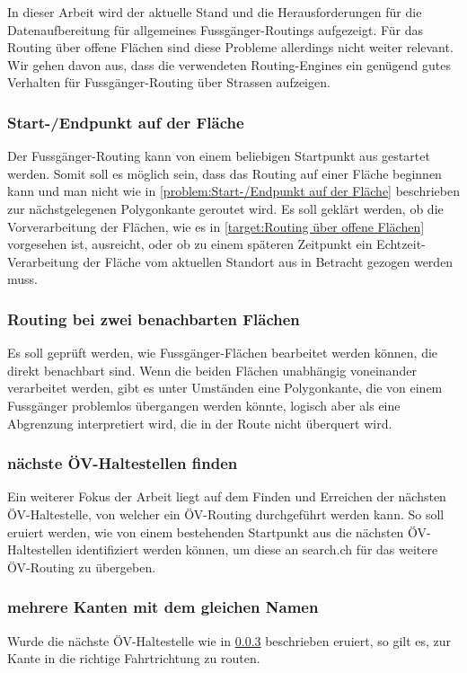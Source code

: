 In dieser Arbeit wird der aktuelle Stand und die Herausforderungen für die Datenaufbereitung für allgemeines Fussgänger-Routings aufgezeigt. Für das Routing über offene Flächen sind diese Probleme allerdings nicht weiter relevant. Wir gehen davon aus, dass die verwendeten Routing-Engines ein genügend gutes Verhalten für Fussgänger-Routing über Strassen aufzeigen.

\subsubsection{Start-/Endpunkt auf der Fläche}
\label{target:Start-/Endpunkt auf der Fläche}
Der Fussgänger-Routing kann von einem beliebigen Startpunkt aus gestartet werden. Somit soll es möglich sein, dass das Routing auf einer Fläche beginnen kann und man nicht wie in \ref{problem:Start-/Endpunkt auf der Fläche} beschrieben zur nächstgelegenen Polygonkante geroutet wird. Es soll geklärt werden, ob die Vorverarbeitung der Flächen, wie es in \ref{target:Routing über offene Flächen} vorgesehen ist, ausreicht, oder ob zu einem späteren Zeitpunkt ein Echtzeit-Verarbeitung der Fläche vom aktuellen Standort aus in Betracht gezogen werden muss.

\subsubsection{Routing bei zwei benachbarten Flächen}
\label{target:Routing bei zwei benachbarten Flächen}

Es soll geprüft werden, wie Fussgänger-Flächen bearbeitet werden können, die direkt benachbart sind. Wenn die beiden Flächen unabhängig voneinander verarbeitet werden, gibt es unter Umständen eine Polygonkante, die von einem Fussgänger problemlos übergangen werden könnte, logisch aber als eine Abgrenzung interpretiert wird, die in der Route nicht überquert wird.

\subsubsection{nächste ÖV-Haltestellen finden}
\label{target:nächste ÖV-Haltestellen finden}
Ein weiterer Fokus der Arbeit liegt auf dem Finden und Erreichen der nächsten ÖV-Haltestelle, von welcher ein ÖV-Routing durchgeführt werden kann. So soll eruiert werden, wie von einem bestehenden Startpunkt aus die nächsten ÖV-Haltestellen identifiziert werden können, um diese an search.ch für das weitere ÖV-Routing zu übergeben.

\subsubsection{mehrere Kanten mit dem gleichen Namen}
\label{target:mehrere Kanten mit dem gleichen Namen}
Wurde die nächste ÖV-Haltestelle wie in \ref{target:nächste ÖV-Haltestellen finden} beschrieben eruiert, so gilt es, zur \gls{Kante} in die richtige Fahrtrichtung zu routen.

